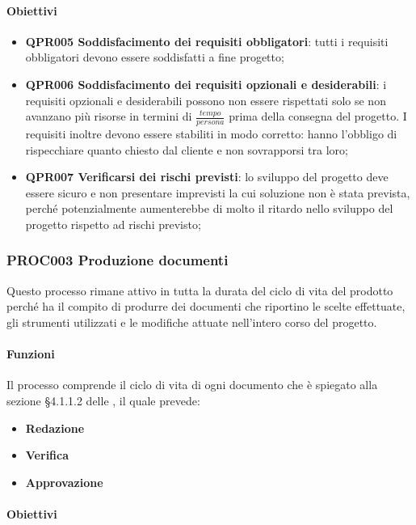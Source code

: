 		\paragraph*{Obiettivi}
		
		\begin{itemize}
			\item \textbf{QPR005 Soddisfacimento dei requisiti obbligatori}: tutti i requisiti obbligatori devono essere soddisfatti a fine progetto;
			\item \textbf{QPR006 Soddisfacimento dei requisiti opzionali e desiderabili}: i requisiti opzionali e desiderabili possono non essere rispettati solo se non avanzano più risorse in termini di $ \frac{tempo}{persona} $ prima della consegna del progetto. I requisiti inoltre devono essere stabiliti in modo corretto: hanno l'obbligo di rispecchiare quanto chiesto dal cliente e non sovrapporsi tra loro;
			\item \textbf{QPR007 Verificarsi dei rischi previsti}: lo sviluppo del progetto deve essere sicuro e non presentare imprevisti la cui soluzione non è stata prevista, perché potenzialmente aumenterebbe di molto il ritardo nello sviluppo del progetto rispetto ad rischi previsto;
		\end{itemize}
	
	\subsubsection{PROC003 Produzione documenti}
	Questo processo rimane attivo in tutta la durata del ciclo di vita del prodotto perché ha il compito di produrre dei documenti che riportino le scelte effettuate, gli strumenti utilizzati e le modifiche attuate nell'intero corso del progetto.
	
		\paragraph*{Funzioni}
		Il processo comprende il ciclo di vita di ogni documento che è spiegato alla sezione §4.1.1.2 delle \Doc{\NdP}, il quale prevede:
		
		\begin{itemize}
			\item \textbf{Redazione}
			\item \textbf{Verifica}
			\item \textbf{Approvazione}
		\end{itemize}
	
		\paragraph*{Obiettivi}
		
